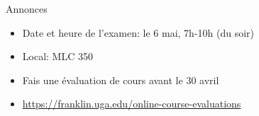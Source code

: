 \begin{frame}{Annonces}
  \begin{itemize}
    \item Date et heure de l'examen: le 6 mai, 7h-10h (du soir)
    \item Local: MLC 350
    \item Fais une évaluation de cours avant le 30 avril
    \item \url{https://franklin.uga.edu/online-course-evaluations}
  \end{itemize}
\end{frame}